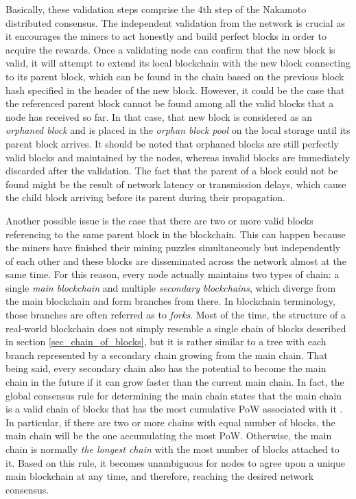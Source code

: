 Basically, these validation steps comprise the 4th step of the Nakamoto distributed consensus. The independent validation from the network is crucial as it encourages the miners to act honestly and build perfect blocks in order to acquire the rewards. Once a validating node can confirm that the new block is valid, it will attempt to extend its local blockchain with the new block connecting to its parent block, which can be found in the chain based on the previous block hash specified in the header of the new block. However, it could be the case that the referenced parent block cannot be found among all the valid blocks that a node has received so far. In that case, that new block is considered as an \textit{orphaned block} and is placed in the \textit{orphan block pool} on the local storage until its parent block arrives. It should be noted that orphaned blocks are still perfectly valid blocks and maintained by the nodes, whereas invalid blocks are immediately discarded after the validation. The fact that the parent of a block could not be found might be the result of network latency or transmission delays, which cause the child block arriving before its parent during their propagation.

Another possible issue is the case that there are two or more valid blocks referencing to the same parent block in the blockchain. This can happen because the miners have finished their mining puzzles simultaneously but independently of each other and these blocks are disseminated across the network almost at the same time. For this reason, every node actually maintains two types of chain: a single \textit{main blockchain} and multiple \textit{secondary blockchains}, which diverge from the main blockchain and form branches from there. In blockchain terminology, those branches are often referred as to \textit{forks}. Most of the time,
the structure of a real-world blockchain does not simply resemble a single chain of blocks described in section \ref{sec_chain_of_blocks}, but it is rather similar to a tree with each branch represented by a secondary chain growing from the main chain. That being said, every secondary chain also has the potential to become the main chain in the future if it can grow faster than the current main chain. In fact, the global consensus rule for determining the main chain states that the main chain is a valid chain of blocks that has the most cumulative PoW associated with it \cite{antonopoulos2017mastering}. In particular, if there are two or more chains with equal number of blocks, the main chain will be the one accumulating the most PoW. Otherwise, the main chain is normally \textit{the longest chain} with the most number of blocks attached to it. Based on this rule, it becomes unambiguous for nodes to agree upon a unique main blockchain at any time, and therefore, reaching the desired network consensus. 

